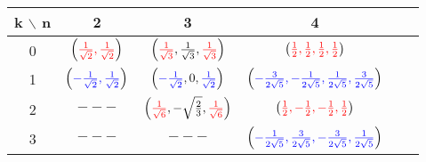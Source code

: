 \begin{center}
\begin{tabular}{ c c c c c c }
k $\backslash$ n & 2 & 3 & 4   \\ 
\hline

0 & $\left(
{\color{red}{\frac{1}{\sqrt{2}}, \frac{1}{\sqrt{2}}}}
\right)$ & 
$\left(
{\color{red}{\frac{1}{\sqrt{3}}}}, 
\frac{1}{\sqrt{3}}, 
{\color{red}{\frac{1}{\sqrt{3}}}} 
\right)$ &   
$\left(
{\color{red}{\frac{1}{2}, \frac{1}{2}, \frac{1}{2}, \frac{1}{2}}}
\right)$ \\ 
1 & 
$\left(
{\color{blue}{-\frac{1}{\sqrt{2}}, \frac{1}{\sqrt{2}}}}
\right)$ & 
$\left(
{\color{blue}{-\frac{1}{\sqrt{2}}}}, 0, 
{\color{blue}{\frac{1}{\sqrt{2}}}} 
\right) $ & 
$\left(
{\color{blue}{-\frac{3}{2\sqrt{5}}, -\frac{1}{2\sqrt{5}}, \frac{1}{2\sqrt{5}}, \frac{3}{2\sqrt{5}}}} 
\right)$  \\ 
2 & $---$ & $\left(
{\color{red}{\frac{1}{\sqrt{6}}}}, -\sqrt{\frac{2}{3}}, 
{\color{red}{\frac{1}{\sqrt{6}}}} \right) $ & 
$\left(
{\color{red}{\frac{1}{2}, -\frac{1}{2}, -\frac{1}{2}, \frac{1}{2}}} 
\right)$ \\ 
3 & $---$ & $---$ & 
$\left(
{\color{blue}{-\frac{1}{2\sqrt{5}}, \frac{3}{2\sqrt{5}}, -\frac{3}{2\sqrt{5}}, \frac{1}{2\sqrt{5}}}}
\right)$  \\ 
\end{tabular}
\end{center} 
 
